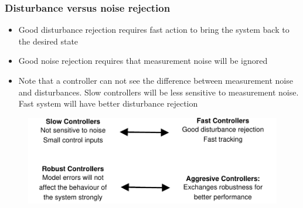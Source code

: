 \begin{frame}
	\frametitle{Disturbance versus noise rejection}
	\begin{block}{}
		\begin{itemize}
			\item Good disturbance rejection requires fast action to bring the system back to the desired state
			\item Good noise rejection requires that measurement noise will be ignored
			\item Note that a controller can not see the difference between measurement noise and disturbances. Slow controllers will be less sensitive to measurement noise. Fast system will have better disturbance rejection
		\end{itemize}
	\end{block}
\end{frame}

\begin{frame}
	\begin{figure}
		\centering
		\includegraphics[width=1.1\linewidth]{comparison}
		\caption{}
		\label{fig:comparison}
	\end{figure}
\end{frame}